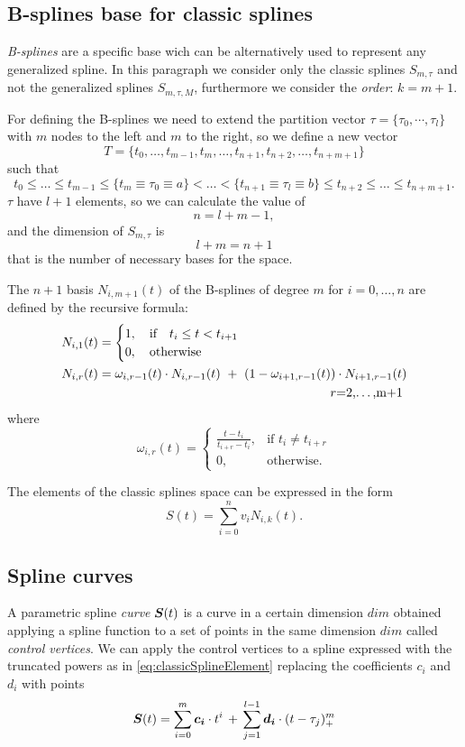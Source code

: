 \documentclass[dissertation.tex]{subfiles}
\begin{document}
\subsection{B-splines base for classic splines}\label{sec:bsplines}
\emph{B-splines} are a specific base wich can be alternatively used to
represent any generalized spline. In this
paragraph we consider only the classic splines $S_{m,\tau}$ and not
the generalized splines $S_{m,\tau,M}$, furthermore we consider the
\emph{order}: $k=m+1$.

For defining the B-splines we need to extend the partition vector
$\tau=\{\tau_0,\cdots,\tau_l\}$ with $m$ nodes to the left and $m$ to
the right, so we define a new vector
$$
T=\{t_0,\dots,t_{m-1},t_{m},\dots,t_{n+1},t_{n+2},\dots,t_{n+m+1}\}
$$
such that
$$
t_0\leq\dots\leq t_{m-1}\leq \{t_{m}\equiv\tau_0\equiv a\}<\dots<
\{t_{n+1}\equiv\tau_l\equiv b\}\leq t_{n+2}\leq\dots\leq t_{n+m+1}.
$$
$\tau$ have $l+1$ elements, so we can calculate the value of
$$
n=l+m-1,
$$
and the dimension of $S_{m,\tau}$ is
$$
l+m=n+1
$$
that is the number of necessary bases for the space.

The $n+1$ basis $N_{i,m+1}(t)$ of the B-splines of degree $m$ for
$i=0,\dots,n$ are defined by the 
recursive formula:
\begin{align*}
  N_{i,1}(t) &=
  \begin{cases}
    1,\quad \mbox{if}\quad t_i\leq t<t_{i+1}\\
    0,\quad \mbox{otherwise}
  \end{cases}\\
  N_{i,r}(t) &= \omega_{i,r-1}(t)\cdot N_{i,r-1}(t)\ +\
  (1-\omega_{i+1,r-1}(t))\cdot N_{i+1,r-1}(t)\\
             &\pushright r=2,\dots,m+1
\end{align*}
where
$$
\omega_{i,r}(t) = \begin{cases}
  \frac{t-t_i}{t_{i+r}-t_i},&\mbox{if }t_i\neq t_{i+r}\\
  0, &\mbox{otherwise.}
\end{cases}
$$

The elements of the classic splines space can be expressed in the form
\begin{equation}\label{eq:bsplineElement}
  S(t)=\sum_{i=0}^nv_i N_{i,k}(t).
\end{equation}

\subsection{Spline curves}
A parametric spline \emph{curve} $\boldsymbol{S}(t)$ is a curve in a certain
dimension $dim$ obtained applying a spline function to a set of points
in the same dimension $dim$
called \emph{control vertices}. We can apply the control vertices to a
spline expressed with the truncated powers as in
\cref{eq:classicSplineElement} replacing the coefficients $c_i$ and
$d_i$ with points
\begin{equation}\label{eq:classicSplineCurve}
  \boldsymbol{S}(t)=\sum_{i=0}^m \boldsymbol{c_i}\cdot t^i\, +\, \sum_{j=1}^{l-1} \boldsymbol{d_i}\cdot (t-\tau_j)_+^m  
\end{equation}
\end{document}
